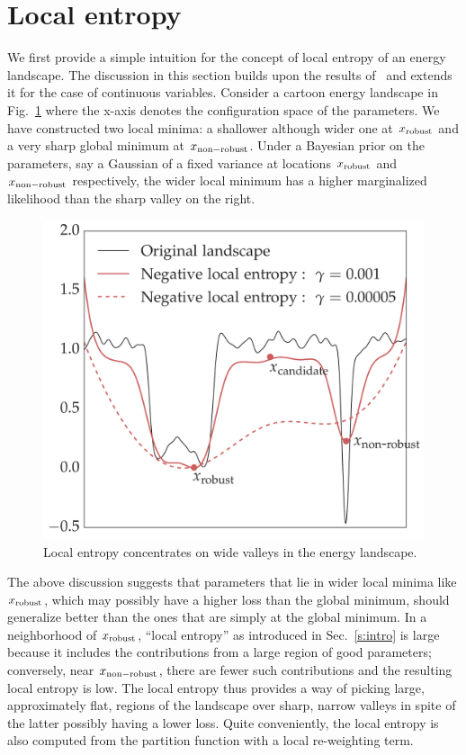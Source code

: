 \documentclass[10pt]{article}
\begin{document}
\section{Local entropy}
\label{s:local_entropy}

We first provide a simple intuition for the concept of local entropy of an energy landscape. The discussion in this section builds upon the results of~\citet{baldassi2016unreasonable} and extends it for the case of continuous variables. Consider a cartoon energy landscape in Fig.~\ref{fig:entropyfig} where the x-axis denotes the configuration space of the parameters. We have constructed two local minima: a shallower although wider one at $x_{\mathrm{robust}}$ and a very sharp global minimum at $x_{\mathrm{non-robust}}$. Under a Bayesian prior on the parameters, say a Gaussian of a fixed variance at locations $x_{\mathrm{robust}}$ and $x_{\mathrm{non-robust}}$ respectively, the wider local minimum has a higher marginalized likelihood than the sharp valley on the right.

\begin{figure}
\centering
\includegraphics[width=0.4 \textwidth]{entropyfig.pdf}
\caption{\small Local entropy concentrates on wide valleys in the energy landscape.}
\label{fig:entropyfig}
\vspace*{-0.1in}
\end{figure}

The above discussion suggests that parameters that lie in wider local minima like $x_{\mathrm{robust}}$, which may possibly have a higher loss than the global minimum, should generalize better than the ones that are simply at the global minimum. In a neighborhood of $x_{\mathrm{robust}}$, ``local entropy'' as introduced in Sec.~\ref{s:intro} is large because it includes the contributions from a large region of good parameters; conversely, near $x_{\mathrm{non-robust}}$, there are fewer such contributions and the resulting local entropy is low. The local entropy thus provides a way of picking large, approximately flat, regions of the landscape over sharp, narrow valleys in spite of the latter possibly having a lower loss. Quite conveniently, the local entropy is also computed from the partition function with a local re-weighting term.
\end{document}
